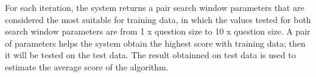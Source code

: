 For each iteration, the system returns a pair search window parameters that are considered the most suitable for training data, in which the values tested for both search window parameters are  from 1 x question size to 10 x question size. A pair of parameters helps the system obtain the highest score with training data; then it will be tested on the test data. The result obtainned on test data is used to estimate the average score of the algorithm.



%
%

